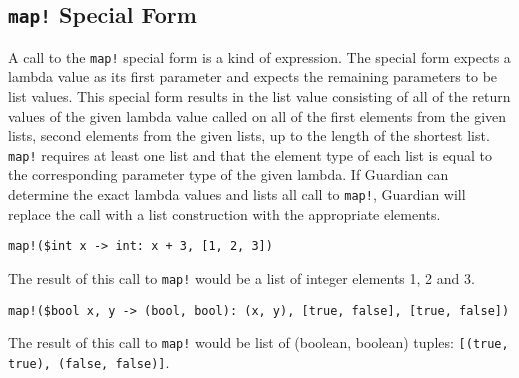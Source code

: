 
\subsection{\texttt{map!} Special Form}
{
	A call to the \texttt{map!} special form is a kind of expression.
	The special form expects a lambda value as its
	first parameter and expects the remaining parameters to be list values.
	This special form results in the list value consisting
	of all of the return values of the given lambda value called on all of the
	first elements from the given lists, second elements from the given
	lists, up to the length of the shortest list.
	\texttt{map!} requires at least one list and that
	the element type of each list is equal to the corresponding parameter type
	of the given lambda.
	If Guardian can determine the exact lambda values and lists all call to
	\texttt{map!}, Guardian will replace the call with a list
	construction with the appropriate elements.
	
	\begin{itemize}
	{
		\item \texttt{map!(\$int x -> int: x + 3, [1, 2, 3])}
		
			The result of this call to \texttt{map!} would be a list of
			integer elements 1, 2 and 3.
		
		\item \texttt{map!(\$bool x, y -> (bool, bool): (x, y), [true, false], [true, false])}
		
			The result of this call to \texttt{map!} would be list of
			(boolean, boolean) tuples: \texttt{[(true, true), (false, false)]}.
	}
	\end{itemize}
}

